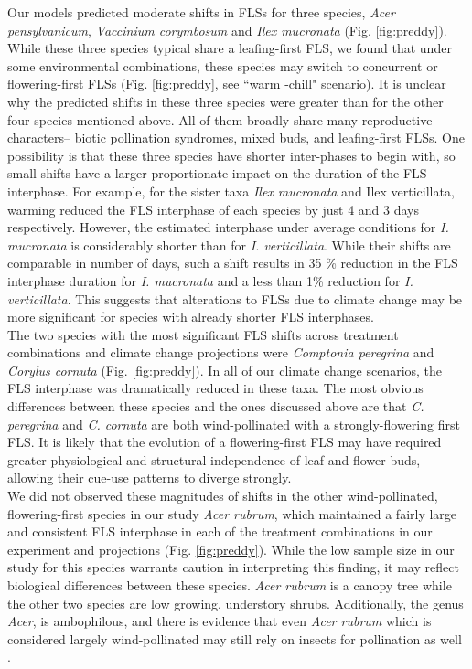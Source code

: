 \documentclass[11pt]{article}
\begin{document}
\noindent Our models predicted moderate shifts in FLSs for three species, \textit{Acer pensylvanicum}, \textit{Vaccinium corymbosum} and \textit{Ilex mucronata} (Fig. \ref{fig:preddy}). While these three species typical share a leafing-first FLS, we found that under some environmental combinations, these species may switch to concurrent or flowering-first FLSs (Fig. \ref{fig:preddy}, see ``warm -chill" scenario). It is unclear why the predicted shifts in these three species were greater than for the other four species mentioned above. All of them broadly share many reproductive characters-- biotic pollination syndromes, mixed buds, and leafing-first FLSs. One possibility is that these three species have shorter inter-phases to begin with, so small shifts have a larger proportionate impact on the duration of the FLS interphase. For example, for the sister taxa \textit{Ilex mucronata} and {Ilex verticillata}, warming reduced the FLS interphase of each species by just 4 and 3 days respectively. However, the estimated interphase under average conditions for \textit{I. mucronata} is considerably shorter than for \textit{I. verticillata}. While their shifts are comparable in number of days, such a shift results in  35 \% reduction in the FLS interphase duration for \textit{I. mucronata} and a less than 1\% reduction for \textit{I. verticillata}. This suggests that alterations to FLSs due to climate change may be more significant for species with already shorter FLS interphases.\\

\noindent The two species with the most significant FLS shifts across treatment combinations and climate change projections were \textit{Comptonia peregrina} and \textit{Corylus cornuta} (Fig. \ref{fig:preddy}). In all of our climate change scenarios, the FLS interphase was dramatically reduced in these taxa. The most obvious differences between these species and the ones discussed above are that \textit{C. peregrina} and \textit{C. cornuta} are both wind-pollinated with a strongly-flowering first FLS. It is likely that the evolution of a flowering-first FLS may have required greater physiological and structural independence of leaf and flower buds, allowing their cue-use patterns to diverge strongly.\\

\noindent We did not observed these magnitudes of shifts in the other wind-pollinated, flowering-first species in our study \textit{Acer rubrum}, which maintained a fairly large and consistent FLS interphase in each of the treatment combinations in our experiment and projections (Fig. \ref{fig:preddy}). While the low sample size in our study for this species warrants caution in interpreting this finding, it may reflect biological differences between these species. \textit{Acer rubrum} is a canopy tree while the other two species are low growing, understory shrubs. Additionally, the genus \textit{Acer}, is ambophilous\citep{Barnes2004}, and there is evidence that even \textit{Acer rubrum} which is considered largely wind-pollinated may still rely on insects for pollination as well \citep{Batra:1985aa}.\\
\end{document}
